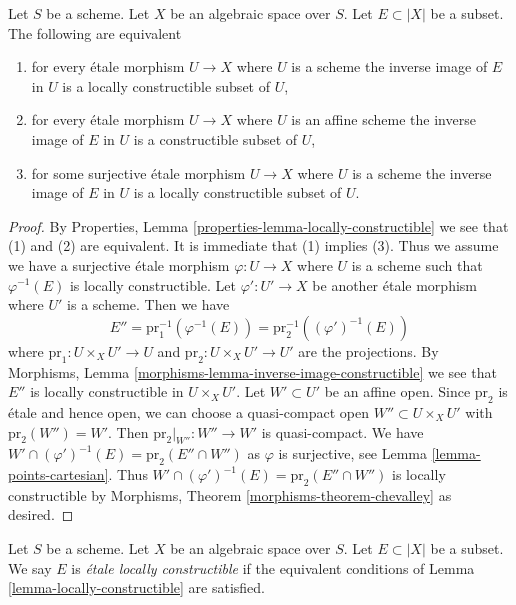 \begin{lemma}
\label{lemma-locally-constructible}
Let $S$ be a scheme. Let $X$ be an algebraic space over $S$.
Let $E \subset |X|$ be a subset. The following are equivalent
\begin{enumerate}
\item for every \'etale morphism $U \to X$ where $U$ is a
scheme the inverse image of $E$ in $U$ is a locally constructible
subset of $U$,
\item for every \'etale morphism $U \to X$ where $U$ is an
affine scheme the inverse image of $E$ in $U$ is a constructible
subset of $U$,
\item for some surjective \'etale morphism $U \to X$ where $U$ is a
scheme the inverse image of $E$ in $U$ is a locally constructible
subset of $U$.
\end{enumerate}
\end{lemma}

\begin{proof}
By Properties, Lemma \ref{properties-lemma-locally-constructible}
we see that (1) and (2) are equivalent. It is immediate that (1)
implies (3). Thus we assume we have a surjective \'etale morphism
$\varphi : U \to X$ where $U$ is a scheme such that $\varphi^{-1}(E)$
is locally constructible. Let $\varphi' : U' \to X$ be another
\'etale morphism where $U'$ is a scheme. Then we have
$$
E'' = \text{pr}_1^{-1}(\varphi^{-1}(E)) = \text{pr}_2^{-1}((\varphi')^{-1}(E))
$$
where $\text{pr}_1 : U \times_X U' \to U$ and
$\text{pr}_2 : U \times_X U' \to U'$ are the projections.
By Morphisms, Lemma \ref{morphisms-lemma-inverse-image-constructible}
we see that $E''$ is locally constructible in $U \times_X U'$.
Let $W' \subset U'$ be an affine open. Since $\text{pr}_2$ is
\'etale and hence open, we can choose a quasi-compact open
$W'' \subset U \times_X U'$ with $\text{pr}_2(W'') = W'$.
Then $\text{pr}_2|_{W''} : W'' \to W'$ is quasi-compact.
We have $W' \cap (\varphi')^{-1}(E) = \text{pr}_2(E'' \cap W'')$
as $\varphi$ is surjective, see Lemma \ref{lemma-points-cartesian}.
Thus $W' \cap (\varphi')^{-1}(E) = \text{pr}_2(E'' \cap W'')$
is locally constructible by
Morphisms, Theorem \ref{morphisms-theorem-chevalley} as desired.
\end{proof}

\begin{definition}
\label{definition-locally-constructible}
Let $S$ be a scheme. Let $X$ be an algebraic space over $S$.
Let $E \subset |X|$ be a subset. We say $E$ is
{\it \'etale locally constructible} if the equivalent
conditions of Lemma \ref{lemma-locally-constructible} are satisfied.
\end{definition}


